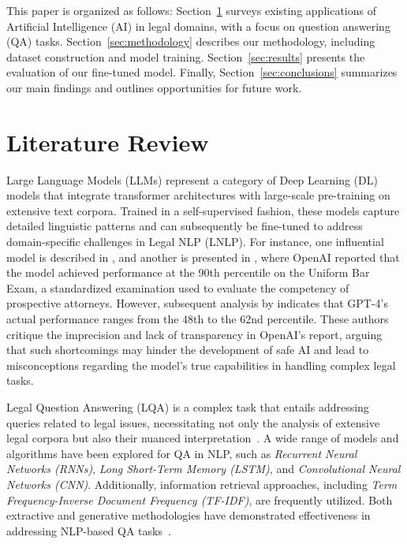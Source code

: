 \documentclass[runningheads]{llncs}
\begin{document}
This paper is organized as follows:
Section~\ref{sec:literature-review} surveys existing applications of
Artificial Intelligence (AI) in legal domains, with a focus on
question answering (QA) tasks. Section~\ref{sec:methodology} describes
our methodology, including dataset construction and model
training. Section~\ref{sec:results} presents the evaluation of our
fine-tuned model. Finally, Section~\ref{sec:conclusions} summarizes
our main findings and outlines opportunities for future work.


\section{Literature Review}
\label{sec:literature-review}

Large Language Models (LLMs) represent a category of Deep Learning (DL)
models that integrate transformer architectures with large-scale
pre-training on extensive text corpora. Trained in a self-supervised
fashion, these models capture detailed linguistic patterns and can
subsequently be fine-tuned to address domain-specific challenges in
Legal NLP (LNLP). For instance, one influential model is described in
\cite{Devlin2018bert}, and another is presented in
\cite{Radford2018gpt}, where OpenAI reported that the model achieved
performance at the 90th percentile on the Uniform Bar Exam, a
standardized examination used to evaluate the competency of
prospective attorneys. However, subsequent analysis by
\cite{Martinez2024} indicates that GPT-4's actual performance ranges
from the 48th to the 62nd percentile. These authors critique the
imprecision and lack of transparency in OpenAI's report, arguing that
such shortcomings may hinder the development of safe AI and lead to
misconceptions regarding the model's true capabilities in handling
complex legal tasks.

Legal Question Answering (LQA) is a complex task that entails
addressing queries related to legal issues, necessitating not only the
analysis of extensive legal corpora but also their nuanced
interpretation~\cite{Ariai2024}. A wide range of models and algorithms
have been explored for QA in NLP, such as
\textit{Recurrent Neural Networks (RNNs)}, \textit{Long Short-Term
  Memory (LSTM)}, and \textit{Convolutional Neural Networks
  (CNN)}. Additionally, information retrieval approaches, including
\textit{Term Frequency-Inverse Document Frequency (TF-IDF)}, are
frequently utilized. Both extractive and generative methodologies have
demonstrated effectiveness in addressing NLP-based QA
tasks~\cite{Luo2022NLP}.
\end{document}
